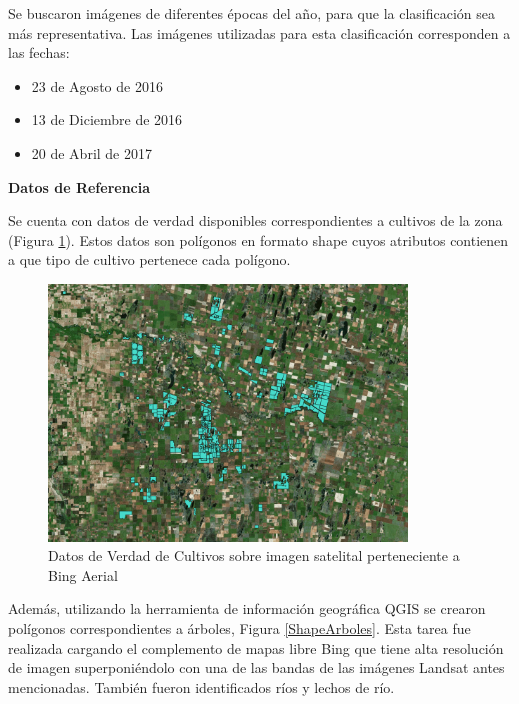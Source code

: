 \documentclass[10pt,a4paper, twoside]{report}
\begin{document}
Se buscaron imágenes de diferentes épocas del año, para que la clasificación sea más representativa. Las imágenes utilizadas para esta clasificación corresponden a las fechas:

\begin{itemize}	
	\item 23 de Agosto de 2016
	\item 13 de Diciembre de 2016
	\item 20 de Abril de 2017
\end{itemize}

\textbf{Datos de Referencia}

Se cuenta con datos de verdad disponibles correspondientes a cultivos de la zona (Figura \ref{DatosDeVerdadCultivos}). Estos datos son polígonos en formato shape cuyos atributos contienen a que tipo de cultivo pertenece cada polígono.

\begin{figure}[!htb]
   \centering      
   \includegraphics[width=0.85\textwidth]{imagenes/DatosDeVerdadCultivos.jpg}
 \caption{Datos de Verdad de Cultivos sobre imagen satelital perteneciente a Bing Aerial}
 \label{DatosDeVerdadCultivos}
\end{figure}

Además, utilizando la herramienta de información geográfica QGIS se crearon polígonos correspondientes a árboles, Figura \ref{ShapeArboles}. Esta tarea fue realizada cargando el complemento de mapas libre Bing que tiene alta resolución de imagen superponiéndolo con una de las bandas de las imágenes Landsat antes mencionadas. También fueron identificados ríos y lechos de río.
\end{document}
